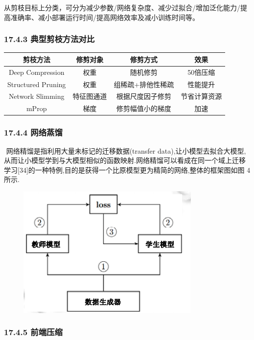 从剪枝目标上分类，可分为减少参数/网络复杂度、减少过拟合/增加泛化能力/提高准确率、减小部署运行时间/提高网络效率及减小训练时间等。

\subsubsection{17.4.3
典型剪枝方法对比}\label{ux5178ux578bux526aux679dux65b9ux6cd5ux5bf9ux6bd4}

\begin{longtable}[]{ cccc }
\toprule
剪枝方法 & 修剪对象 & 修剪方式 & 效果\tabularnewline
\midrule
\endhead
Deep Compression & 权重 & 随机修剪 & 50倍压缩\tabularnewline
Structured Pruning & 权重 & 组稀疏+排他性稀疏 & 性能提升\tabularnewline
Network Slimming & 特征图通道 & 根据尺度因子修剪 &
节省计算资源\tabularnewline
mProp & 梯度 & 修剪幅值小的梯度 & 加速\tabularnewline
\bottomrule
\end{longtable}

\subsubsection{17.4.4 网络蒸馏}\label{ux7f51ux7edcux84b8ux998f}

​ 网络精馏是指利用大量未标记的迁移数据(transfer
data),让小模型去拟合大模型,从而让小模型学到与大模型相似的函数映射.网络精馏可以看成在同一个域上迁移学习{[}34{]}的一种特例,目的是获得一个比原模型更为精简的网络,整体的框架图如图
4所示.

\begin{figure}
\centering
\includegraphics{./img/ch17/网络蒸馏.png}
\caption{}
\end{figure}

\subsubsection{17.4.5 前端压缩}\label{ux524dux7aefux538bux7f29}

